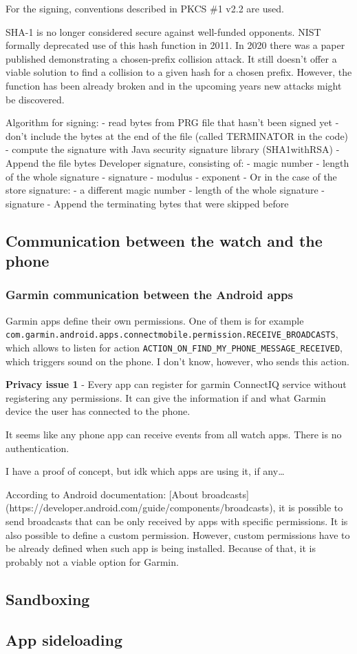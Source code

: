 For the signing, conventions described in PKCS \#1 v2.2 are used.

SHA-1 is no longer considered secure against well-funded opponents.
NIST formally deprecated use of this hash function in 2011.
In 2020 there was a paper published demonstrating a chosen-prefix collision attack.
It still doesn't offer a viable solution to find a collision to a given hash for a chosen prefix.
However, the function has been already broken and in the upcoming years new attacks might be discovered.

Algorithm for signing:
- read bytes from PRG file that hasn't been signed yet
- don't include the bytes at the end of the file (called TERMINATOR in the code)
- compute the signature with Java security signature library (SHA1withRSA)
- Append the file bytes Developer signature, consisting of:
- magic number
- length of the whole signature
- signature
- modulus
- exponent
- Or in the case of the store signature:
- a different magic number
- length of the whole signature
- signature
- Append the terminating bytes that were skipped before

\subsection{Communication between the watch and the phone}

\subsubsection{Garmin communication between the Android apps}
Garmin apps define their own permissions.
One of them is for example \verb|com.garmin.android.apps.connectmobile.permission.RECEIVE_BROADCASTS|, which allows to listen for action \verb|ACTION_ON_FIND_MY_PHONE_MESSAGE_RECEIVED|, which triggers sound on the phone.
I don't know, however, who sends this action.

\textbf{Privacy issue 1} - Every app can register for garmin ConnectIQ service without registering any permissions.
It can give the information if and what Garmin device the user has connected to the phone.

It seems like any phone app can receive events from all watch apps.
There is no authentication.

I have a proof of concept, but idk which apps are using it, if any\ldots

According to Android documentation: [About broadcasts](https://developer.android.com/guide/components/broadcasts),
it is possible to send broadcasts that can be only received by apps with specific permissions.
It is also possible to define a custom permission.
However, custom permissions have to be already defined when such app is being installed.
Because of that, it is probably not a viable option for Garmin.


\subsection{Sandboxing}
\subsection{App sideloading}